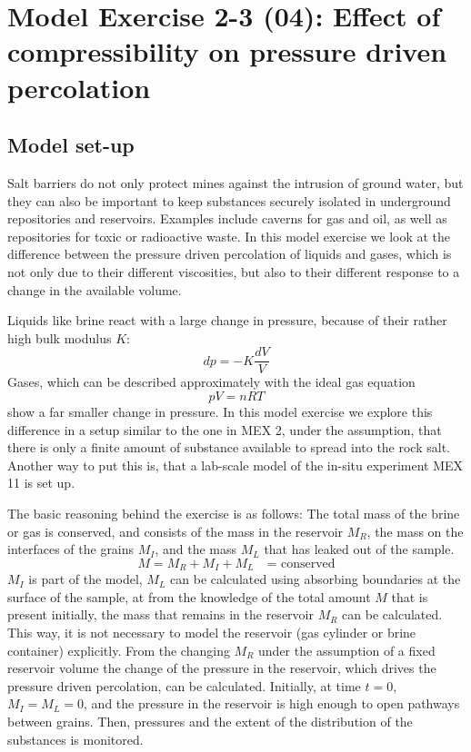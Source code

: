 \section[MEX 2-3: Pressure driven percolation]{Model Exercise 2-3 (04): Effect of compressibility on pressure driven percolation}
\label{sec:mex04}
\subsection{Model set-up}
Salt barriers do not only protect mines against the intrusion of ground water, but they can also be important to keep substances securely isolated in underground repositories and reservoirs. Examples include caverns for gas and oil, as well as repositories for toxic or radioactive waste. In this model exercise we look at the difference between the pressure driven percolation of liquids and gases, which is not only due to their different viscosities, but also to their different response to a change in the available volume. 

Liquids like brine react with a large change in pressure, because of their rather high bulk modulus $K$:
\begin{equation}
dp = -K \frac{dV}{V}
\end{equation}
Gases, which can be described approximately with the ideal gas equation
\begin{equation}
pV=nRT
\end{equation}
show a far smaller change in pressure. In this model exercise we explore this difference in a setup similar to the one in MEX 2, under the assumption, that there is only a finite amount of substance available to spread into the rock salt. Another way to put this is, that a lab-scale model of the in-situ experiment MEX 11 is set up. 

The basic reasoning behind the exercise is as follows: The total mass of the brine or gas is conserved, and consists of the mass in the reservoir $M_R$, the mass on the interfaces of the grains $M_I$, and the mass $M_L$ that has leaked out of the sample.
\begin{equation}
M = M_R + M_I + M_L \quad \mbox{= conserved}
\end{equation}
$M_I$ is part of the model, $M_L$ can be calculated using absorbing boundaries at the surface of the sample, at from the knowledge of the total amount $M$ that is present initially, the mass that remains in the reservoir $M_R$ can be calculated. This way, it is not necessary to model the reservoir (gas cylinder or brine container) explicitly. From the changing $M_R$ under the assumption of a fixed reservoir volume the change of the pressure in the reservoir, which drives the pressure driven percolation, can be calculated. Initially, at time $t=0$, $M_I=M_L=0$, and the pressure in the reservoir is high enough to open pathways between grains. Then, pressures and the extent of the distribution of the substances is monitored. 

